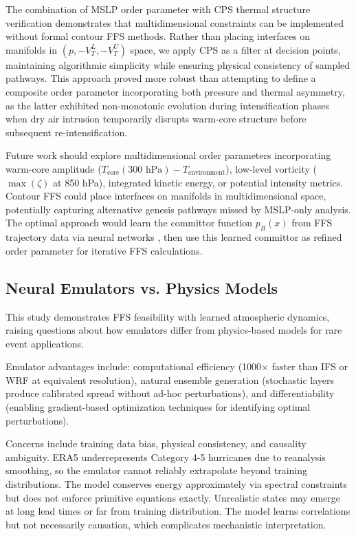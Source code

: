 \documentclass[11pt]{article}
\begin{document}
The combination of MSLP order parameter with CPS thermal structure verification demonstrates that multidimensional constraints can be implemented without formal contour FFS methods. Rather than placing interfaces on manifolds in $(p, -V_T^L, -V_T^U)$ space, we apply CPS as a filter at decision points, maintaining algorithmic simplicity while ensuring physical consistency of sampled pathways. This approach proved more robust than attempting to define a composite order parameter incorporating both pressure and thermal asymmetry, as the latter exhibited non-monotonic evolution during intensification phases when dry air intrusion temporarily disrupts warm-core structure before subsequent re-intensification.

Future work should explore multidimensional order parameters incorporating warm-core amplitude ($T_{\text{core}}(300 \text{ hPa}) - T_{\text{environment}}$), low-level vorticity ($\max(\zeta)$ at 850 hPa), integrated kinetic energy, or potential intensity metrics. Contour FFS \citep{defever2019contour} could place interfaces on manifolds in multidimensional space, potentially capturing alternative genesis pathways missed by MSLP-only analysis. The optimal approach would learn the committor function $p_B(x)$ from FFS trajectory data via neural networks \citep{rotskoff2018machine}, then use this learned committor as refined order parameter for iterative FFS calculations.

\subsection{Neural Emulators vs. Physics Models}

This study demonstrates FFS feasibility with learned atmospheric dynamics, raising questions about how emulators differ from physics-based models for rare event applications.

Emulator advantages include: computational efficiency (1000$\times$ faster than IFS or WRF at equivalent resolution), natural ensemble generation (stochastic layers produce calibrated spread without ad-hoc perturbations), and differentiability (enabling gradient-based optimization techniques for identifying optimal perturbations).

Concerns include training data bias, physical consistency, and causality ambiguity. ERA5 underrepresents Category 4-5 hurricanes due to reanalysis smoothing, so the emulator cannot reliably extrapolate beyond training distributions. The model conserves energy approximately via spectral constraints but does not enforce primitive equations exactly. Unrealistic states may emerge at long lead times or far from training distribution. The model learns correlations but not necessarily causation, which complicates mechanistic interpretation.
\end{document}
